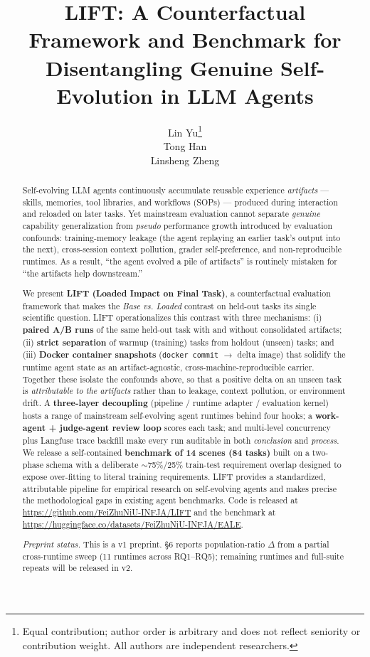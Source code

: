 \documentclass{article}
\title{LIFT: A Counterfactual Framework and Benchmark for Disentangling Genuine Self-Evolution in LLM Agents}
\author{%
  Lin Yu\thanks{Equal contribution; author order is arbitrary and does not reflect seniority or contribution weight. All authors are independent researchers.} \\
  \And
  Tong Han\footnotemark[1] \\
  \And
  Linsheng Zheng\footnotemark[1] \\
}
\begin{document}
\maketitle


\begin{abstract}
Self-evolving LLM agents continuously accumulate reusable experience \emph{artifacts} --- skills, memories, tool libraries, and workflows (SOPs) --- produced during interaction and reloaded on later tasks. Yet mainstream evaluation cannot separate \emph{genuine} capability generalization from \emph{pseudo} performance growth introduced by evaluation confounds: training-memory leakage (the agent replaying an earlier task's output into the next), cross-session context pollution, grader self-preference, and non-reproducible runtimes. As a result, ``the agent evolved a pile of artifacts'' is routinely mistaken for ``the artifacts help downstream.''

We present \textbf{LIFT (Loaded Impact on Final Task)}, a counterfactual evaluation framework that makes the \emph{Base vs. Loaded} contrast on held-out tasks its single scientific question. LIFT operationalizes this contrast with three mechanisms: (i) \textbf{paired A/B runs} of the same held-out task with and without consolidated artifacts; (ii) \textbf{strict separation} of warmup (training) tasks from holdout (unseen) tasks; and (iii) \textbf{Docker container snapshots} (\texttt{docker commit} $\rightarrow$ delta image) that solidify the runtime agent state as an artifact-agnostic, cross-machine-reproducible carrier. Together these isolate the confounds above, so that a positive delta on an unseen task is \emph{attributable to the artifacts} rather than to leakage, context pollution, or environment drift. A \textbf{three-layer decoupling} (pipeline / runtime adapter / evaluation kernel) hosts a range of mainstream self-evolving agent runtimes behind four hooks; a \textbf{work-agent + judge-agent review loop} scores each task; and multi-level concurrency plus Langfuse trace backfill make every run auditable in both \emph{conclusion} and \emph{process}. We release a self-contained \textbf{benchmark of 14 scenes (84 tasks)} built on a two-phase schema with a deliberate $\sim$75\%/25\% train-test requirement overlap designed to expose over-fitting to literal training requirements. LIFT provides a standardized, attributable pipeline for empirical research on self-evolving agents and makes precise the methodological gaps in existing agent benchmarks. Code is released at \url{https://github.com/FeiZhuNiU-INFJA/LIFT} and the benchmark at \url{https://huggingface.co/datasets/FeiZhuNiU-INFJA/EALE}.

\emph{Preprint status.} This is a v1 preprint. §6 reports population-ratio $\Delta$ from a partial cross-runtime sweep (11 runtimes across RQ1--RQ5); remaining runtimes and full-suite repeats will be released in v2.
\end{abstract}
\end{document}
